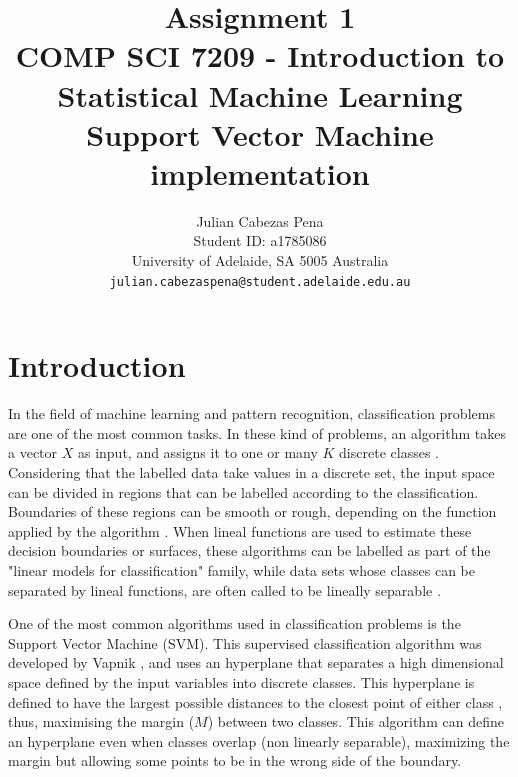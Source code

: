 \documentclass[11pt,twocolumn,letterpaper]{article}
\begin{document}
\title{Assignment 1 \\ COMP SCI 7209 - Introduction to Statistical Machine Learning\\ Support Vector Machine implementation}

\author{Julian Cabezas Pena\\
Student ID: a1785086\\
University of Adelaide, SA 5005 Australia\\
{\tt\small julian.cabezaspena@student.adelaide.edu.au}
}

\maketitle


\section{Introduction}

In the field of machine learning  and pattern recognition, classification problems are one of the most common tasks. In these kind of problems, an algorithm takes a vector $X$ as input, and assigns it to one or many $K$ discrete classes \cite{Bishop2006}. Considering that the labelled data take values in a discrete set, the input space can be divided in regions that can be labelled according to the classification. Boundaries of these regions can be smooth or rough, depending on the function applied by the algorithm \cite{Hastie2009}. When lineal functions are used to estimate these decision boundaries or surfaces, these algorithms can be labelled as part of the "linear models for classification" family, while data sets whose classes can be separated by lineal functions, are often called to be lineally separable \cite{Bishop2006}.

One of the most common algorithms used in classification problems is the Support Vector Machine (SVM). This supervised classification algorithm was developed by Vapnik \cite{Vapnik1995}, and uses an hyperplane that separates a high dimensional space defined by the input variables into discrete classes. This hyperplane is defined to have the largest possible distances to the closest point of either class \cite{Hastie2009}, thus, maximising the margin ($M$) between two classes. This algorithm can define an hyperplane even when classes overlap (non linearly separable), maximizing the margin but allowing some points to be in the wrong side of the boundary.
\end{document}

